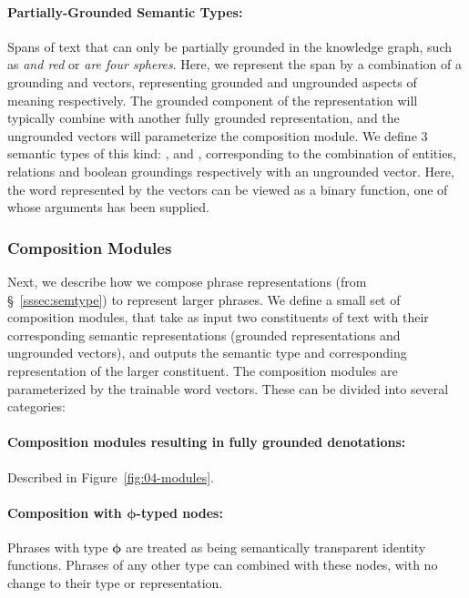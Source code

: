 \documentclass[main.tex]{subfiles}
\begin{document}
\paragraph{Partially-Grounded Semantic Types:}
Spans of text that can only be partially grounded in the knowledge graph, such as \emph{and red} or \emph{are four spheres}. Here, we represent the span by a combination of a grounding and vectors, representing grounded and ungrounded aspects of meaning respectively.
The grounded component of the representation will typically combine with another fully grounded representation, and the ungrounded vectors will parameterize the composition module.
We define 3 semantic types of this kind: ,  and , corresponding to the combination of entities, relations and boolean groundings respectively with an ungrounded vector. Here, the word represented by the vectors can be viewed as a binary function, one of whose arguments has been supplied.


\subsubsection{Composition Modules}
\label{sssec:comprules}
Next, we describe how we compose phrase representations (from \S~\ref{sssec:semtype}) to represent larger phrases.
We define a small set of composition modules, that take as input two constituents of text with their corresponding semantic representations (grounded representations and ungrounded vectors), and outputs the semantic type and corresponding representation of the larger constituent.
The composition modules are parameterized by the trainable word vectors.
These can be divided into several categories:

\paragraph{Composition modules resulting in fully grounded denotations:} Described in Figure~\ref{fig:04-modules}.




\paragraph{Composition with $\pmb{\phi}$-typed nodes:} Phrases with type $\pmb{\phi}$ are treated as being semantically transparent identity functions. Phrases of any other type can combined with these nodes, with no change to their type or representation.
\end{document}
